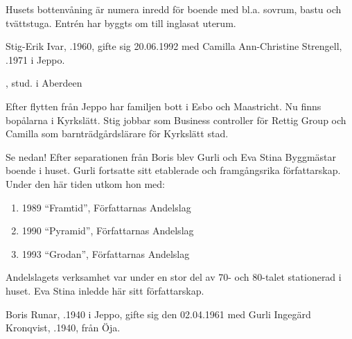 Husets bottenvåning är numera inredd för boende med bl.a. sovrum, bastu och tvättstuga. Entrén har byggts om till inglasat uterum.


Stig-Erik Ivar, .1960, gifte sig 20.06.1992 med Camilla Ann-Christine Strengell, .1971 i Jeppo.
\begin{jhchildren}
  \item {}, stud. i Aberdeen
  \item {}
  \item {}
  \item {}
\end{jhchildren}

Efter flytten från Jeppo har familjen bott i Esbo och Maastricht. Nu finns bopålarna i Kyrkslätt. Stig jobbar som Business controller för Rettig Group och Camilla som barnträdgårdslärare för Kyrkslätt stad.


Se nedan! Efter separationen från Boris blev Gurli och Eva Stina Byggmästar	boende i huset. Gurli fortsatte sitt etablerade och framgångsrika författarskap. Under den här tiden utkom hon med:
\begin{enumerate}
  \item 1989	``Framtid'', Författarnas Andelslag
  \item 1990	``Pyramid'', Författarnas Andelslag
  \item 1993	``Grodan'', Författarnas Andelslag
\end{enumerate}


Andelslagets verksamhet var under en stor del av 70- och 80-talet stationerad i huset. Eva Stina inledde här sitt författarskap.


Boris Runar, .1940 i Jeppo, gifte sig den 02.04.1961 med Gurli Ingegärd Kronqvist, .1940, från Öja.
\begin{jhchildren}
  \item {}
  \item {}
  \item {}
\end{jhchildren}

